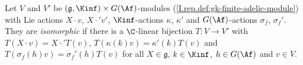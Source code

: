 Let $V$ and $V'$ be $(\mathfrak g,\Kinf)\times G(\Af)$-modules (\cref{I.rep.def:gk-finite-adelic-module}) with Lie
actions $X\cdot v$, $X\cdot'v'$, $\Kinf$-actions $\kappa$, $\kappa'$ and $G(\Af)$-actions $\sigma_f$, $\sigma_f'$. They are
\emph{isomorphic} if there is a $\C$-linear bijection $T\colon V\to V'$ with $T(X\cdot v)=X\cdot'T(v)$,
$T(\kappa(k)v)=\kappa'(k)T(v)$ and $T(\sigma_f(h)v)=\sigma_f'(h)T(v)$ for all $X\in\mathfrak g$, $k\in\Kinf$,
$h\in G(\Af)$ and $v\in V$.
